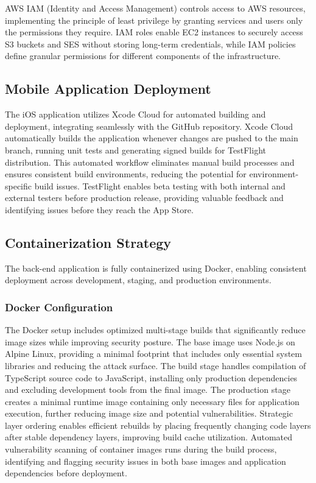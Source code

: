 AWS IAM (Identity and Access Management) controls access to AWS resources, implementing the principle of least privilege by granting services and users only the permissions they require. IAM roles enable EC2 instances to securely access S3 buckets and SES without storing long-term credentials, while IAM policies define granular permissions for different components of the infrastructure.

\subsection{Mobile Application Deployment}
The iOS application utilizes Xcode Cloud for automated building and deployment, integrating seamlessly with the GitHub repository. Xcode Cloud automatically builds the application whenever changes are pushed to the main branch, running unit tests and generating signed builds for TestFlight distribution. This automated workflow eliminates manual build processes and ensures consistent build environments, reducing the potential for environment-specific build issues. TestFlight enables beta testing with both internal and external testers before production release, providing valuable feedback and identifying issues before they reach the App Store.

\subsection{Containerization Strategy}
The back-end application is fully containerized using Docker, enabling consistent deployment across development, staging, and production environments.

\subsubsection{Docker Configuration}
The Docker setup includes optimized multi-stage builds that significantly reduce image sizes while improving security posture. The base image uses Node.js on Alpine Linux, providing a minimal footprint that includes only essential system libraries and reducing the attack surface. The build stage handles compilation of TypeScript source code to JavaScript, installing only production dependencies and excluding development tools from the final image. The production stage creates a minimal runtime image containing only necessary files for application execution, further reducing image size and potential vulnerabilities. Strategic layer ordering enables efficient rebuilds by placing frequently changing code layers after stable dependency layers, improving build cache utilization. Automated vulnerability scanning of container images runs during the build process, identifying and flagging security issues in both base images and application dependencies before deployment.


